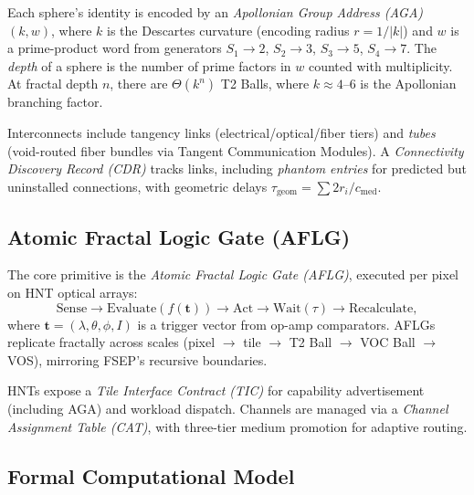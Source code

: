 \documentclass[11pt,letterpaper]{article}
\begin{document}
Each sphere's identity is encoded by an \emph{Apollonian Group Address (AGA)} $(k, w)$, where $k$ is the Descartes curvature (encoding radius $r = 1/|k|$) and $w$ is a prime-product word from generators $S_1 \to 2$, $S_2 \to 3$, $S_3 \to 5$, $S_4 \to 7$. The \emph{depth} of a sphere is the number of prime factors in $w$ counted with multiplicity. At fractal depth $n$, there are $\Theta(k^n)$ T2 Balls, where $k \approx 4$--$6$ is the Apollonian branching factor.

Interconnects include tangency links (electrical/optical/fiber tiers) and \emph{tubes} (void-routed fiber bundles via Tangent Communication Modules). A \emph{Connectivity Discovery Record (CDR)} tracks links, including \emph{phantom entries} for predicted but uninstalled connections, with geometric delays $\tau_{\text{geom}} = \sum 2r_i / c_{\text{med}}$.

\subsection{Atomic Fractal Logic Gate (AFLG)}

The core primitive is the \emph{Atomic Fractal Logic Gate (AFLG)}, executed per pixel on HNT optical arrays:
\[
\text{Sense} \to \text{Evaluate}(f(\mathbf{t})) \to \text{Act} \to \text{Wait}(\tau) \to \text{Recalculate},
\]
where $\mathbf{t} = (\lambda, \theta, \phi, I)$ is a trigger vector from op-amp comparators. AFLGs replicate fractally across scales (pixel $\to$ tile $\to$ T2 Ball $\to$ VOC Ball $\to$ VOS), mirroring FSEP's recursive boundaries.

HNTs expose a \emph{Tile Interface Contract (TIC)} for capability advertisement (including AGA) and workload dispatch. Channels are managed via a \emph{Channel Assignment Table (CAT)}, with three-tier medium promotion for adaptive routing.

\subsection{Formal Computational Model}
\end{document}
